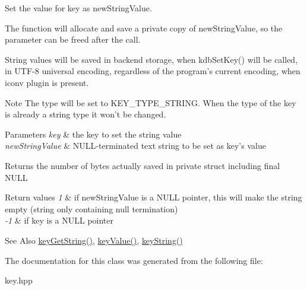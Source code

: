 Set the value for {\ttfamily key} as {\ttfamily new\-String\-Value}.

The function will allocate and save a private copy of {\ttfamily new\-String\-Value}, so the parameter can be freed after the call.

String values will be saved in backend storage, when kdb\-Set\-Key() will be called, in U\-T\-F-\/8 universal encoding, regardless of the program's current encoding, when iconv plugin is present.

\begin{DoxyNote}{Note}
The type will be set to K\-E\-Y\-\_\-\-T\-Y\-P\-E\-\_\-\-S\-T\-R\-I\-N\-G. When the type of the key is already a string type it won't be changed.
\end{DoxyNote}

\begin{DoxyParams}{Parameters}
{\em key} & the key to set the string value \\
\hline
{\em new\-String\-Value} & N\-U\-L\-L-\/terminated text string to be set as {\ttfamily key's} value \\
\hline
\end{DoxyParams}
\begin{DoxyReturn}{Returns}
the number of bytes actually saved in private struct including final N\-U\-L\-L 
\end{DoxyReturn}

\begin{DoxyRetVals}{Return values}
{\em 1} & if new\-String\-Value is a N\-U\-L\-L pointer, this will make the string empty (string only containing null termination) \\
\hline
{\em -\/1} & if key is a N\-U\-L\-L pointer \\
\hline
\end{DoxyRetVals}
\begin{DoxySeeAlso}{See Also}
\hyperlink{group__keyvalue_ga41b9fac5ccddafe407fc0ae1e2eb8778}{key\-Get\-String()}, \hyperlink{group__keyvalue_ga6f29609c5da53c6dc26a98678d5752af}{key\-Value()}, \hyperlink{group__keyvalue_ga880936f2481d28e6e2acbe7486a21d05}{key\-String()} 
\end{DoxySeeAlso}
 

The documentation for this class was generated from the following file\-:\begin{DoxyCompactItemize}
\item 
key.\-hpp\end{DoxyCompactItemize}
